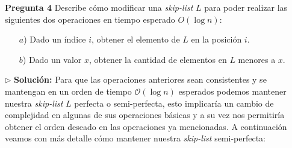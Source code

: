 \textbf{Pregunta 4}
Describe cómo modificar una \textit{skip-list} $L$ para poder realizar las siguientes dos operaciones en tiempo esperado $O(\log n)$:
\begin{itemize}
\item[$a$)] Dado un índice $i$, obtener el elemento de $L$ en la posición $i$.
\item[$b$)] Dado un valor $x$, obtener la cantidad de elementos en $L$ menores a $x$.
\end{itemize}

$\rhd$ \textbf{Solución:} Para que las operaciones anteriores sean consistentes y se mantengan
en un orden de tiempo $\mathcal{O}(\log n)$ esperados podemos mantener nuestra \textit{skip-list}
$L$ perfecta o semi-perfecta, esto implicaría un cambio de complejidad en algunas de sus operaciones
básicas y a su vez nos permitiría obtener el orden deseado en las operaciones ya mencionadas. A continuación
veamos con más detalle cómo mantener nuestra \textit{skip-list} semi-perfecta:
